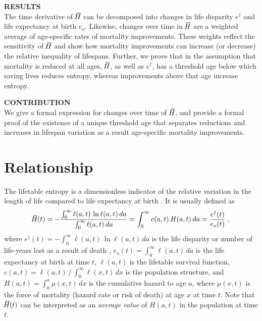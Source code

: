 \documentclass[a4paper,twoside, openright, 12pt, leqno]{article}
\newcommand*\xbar[1]{%
   \hbox{%
     \vbox{%
       \hrule height 0.5pt %
       \kern0.3ex%
       \hbox{%
         \kern-0.28em%
         \ensuremath{#1}%
         \kern-0.05em%
       }%
     }%
   }%
}
\begin{document}
\noindent\textbf{RESULTS} \\
The time derivative of $\,\xbar{H}$ can be decomposed into changes in life disparity $e^\dagger$ and life expectancy at birth $e_o$. Likewise, changes over time in $\,\xbar{H}$ are a weighted average of age-specific rates of mortality improvements. These weights reflect the sensitivity of $\,\xbar{H}$ and show how mortality improvements can increase (or decrease) the relative inequality of lifespans. Further, we prove that in the assumption that mortality is reduced at all ages, $\,\xbar{H}$, as well as $e^\dagger$, has a threshold age below which saving lives reduces entropy, whereas improvements above that age increase entropy.
\bigskip

\noindent\textbf{CONTRIBUTION} \\
We give a formal expression for changes over time of $\,\xbar{H}$, and provide a formal proof of the existence of a unique threshold age that separates reductions and increases in lifespan variation as a result age-specific mortality improvements.

\linespread{2}\normalsize
\clearpage



\section{Relationship}
The lifetable entropy is a dimensionless indicator of the relative variation in the length of life compared to life expectancy at birth \citep{keyfitz1968introduction, Keyfitz1977, demetrius1974demographic, demetrius1978adaptive}. It is usually defined as
%
\begin{equation*}
\xbar{H}(t)=-\frac{\int_0^\infty\ell(a, t)\,\ln\ell(a, t)\,da}{\int_0^\infty\ell(a, t)\,da}=\int_0^\infty c(a, t)\,H(a,t)\,da=\frac{e^\dagger(t)}{e_o(t)}\;,
\end{equation*}
%
where $e^\dagger(t)=-\int_0^\infty\ell(a,t)\,\ln\ell(a,t)\,da$ is the life disparity or number of life-years lost as a result of death \citep{Vaupel2003}, $e_o(t)=\int_0^\infty\ell(a, t)\,da$ is the life expectancy at birth at time $t$, $\ell(a,t)$ is the lifetable survival function, $c(a,t)=\ell(a,t)\,/\,\int_0^\infty\ell(x,t)\,dx$ is the population structure, and $H(a,t)=\int_0^a\mu(x,t)\,dx$ is the cumulative hazard to age $a$, where $\mu(x,t)$ is the force of mortality (hazard rate or risk of death) at age $x$ at time $t$. Note that $\,\xbar{H}(t)$ can be interpreted as an \emph{average value} of $H(a,t)$ in the population at time $t$.
\end{document}
